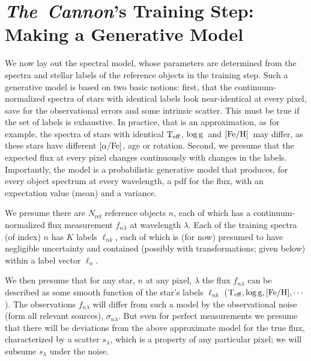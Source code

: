 \documentclass[12pt, preprint]{aastex}
\newcommand{\tc}{\textsl{The~Cannon}}
\newcommand{\set}[1]{\bm{#1}}
\newcommand{\starlabel}{\ell}
\newcommand{\starlabelvec}{\set{\starlabel}}
\newcommand{\teff}{\mbox{$\rm T_{eff}$}}
\newcommand{\feh}{\mbox{$\rm [Fe/H]$}}
\newcommand{\alphafe}{\mbox{$\rm [\alpha/Fe]$}}
\newcommand{\logg}{\mbox{$\rm \log g$}}
\newcommand{\noise}{\sigma_{n\lambda}}
\newcommand{\scatter}{s_{\lambda}}
\newcommand{\rfn}{\mathrm{ref}}
\begin{document}
\section{\tc 's Training Step: Making a Generative Model}
\label{sec:spectralmodel}

We now lay out the spectral model, whose parameters are determined 
from the spectra and stellar labels of the reference objects in the training step.
Such a generative model is based on two basic notions: first, that the continuum-normalized spectra of
stars with identical labels look near-identical at every pixel, save for the observational errors
and some intrinsic scatter. This must be true if the set of labels is exhaustive. 
In practice, that is an approximation, as for example, the spectra of stars with identical \teff , \logg \ and \feh\ may differ, 
as these stars have different \alphafe , age or rotation. Second, we presume that the expected flux at every pixel changes continuously
with changes in the labels.
Importantly, the model is a probabilistic generative model that produces,
for every object spectrum at every wavelength,
a pdf for the flux, with an expectation value (mean) and a variance.

We presume there are $N_\rfn$ reference objects $n$, each of which has
a continuum-normalized flux measurement $f_{n\lambda}$ at wavelength
$\lambda$. Each of the training spectra (of index) $n$ has $K$ labels $\starlabel_{nk}$, each of which
is (for now) presumed to have negligible uncertainty and contained (possibly with transformations; given below)
within a label vector $\starlabelvec_n$.

We then presume that for any star, $n$ at any pixel, $\lambda$  the flux $f_{n\lambda}$  can be described as some smooth function of the star's labels $\starlabel_{nk}$
($\teff,\logg,\feh,\cdots$).
The observations $f_{n\lambda}$ will differ from such a model by the observational noise (form all relevant sources), $\noise$. But even for perfect measurements we presume that there will be
deviations from the above approximate model for the true flux, characterized by a scatter $\scatter$,
which is a property of any particular pixel; we will subsume $\scatter$ under the noise.
\end{document}
